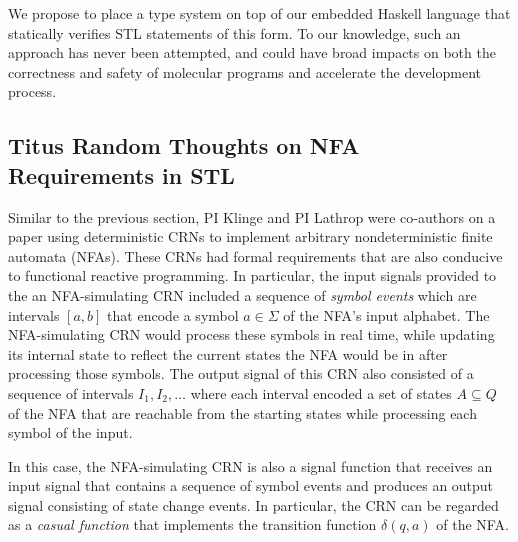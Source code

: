 We propose to place a type system on top of our embedded Haskell language that statically verifies STL statements of this form.
To our knowledge, such an approach has never been attempted, and could have broad impacts on both the correctness and safety of molecular programs and accelerate the development process.

\subsection*{Titus Random Thoughts on NFA Requirements in STL}
Similar to the previous section, PI Klinge and PI Lathrop were co-authors on a paper using deterministic CRNs to implement arbitrary nondeterministic finite automata (NFAs).
These CRNs had formal requirements that are also conducive to functional reactive programming.
In particular, the input signals provided to the an NFA-simulating CRN included a sequence of \emph{symbol events} which are intervals \( [a,b] \) that encode a symbol \( a\in\Sigma \) of the NFA's input alphabet.
The NFA-simulating CRN would process these symbols in real time, while updating its internal state to reflect the current states the NFA would be in after processing those symbols.
The output signal of this CRN also consisted of a sequence of intervals \( I_1, I_2, \ldots \) where each interval encoded a set of states \( A\subseteq Q \) of the NFA that are reachable from the starting states while processing each symbol of the input.

In this case, the NFA-simulating CRN is also a signal function that receives an input signal that contains a sequence of symbol events and produces an output signal consisting of state change events.
In particular, the CRN can be regarded as a \emph{casual function} that implements the transition function \( \delta(q,a) \) of the NFA.